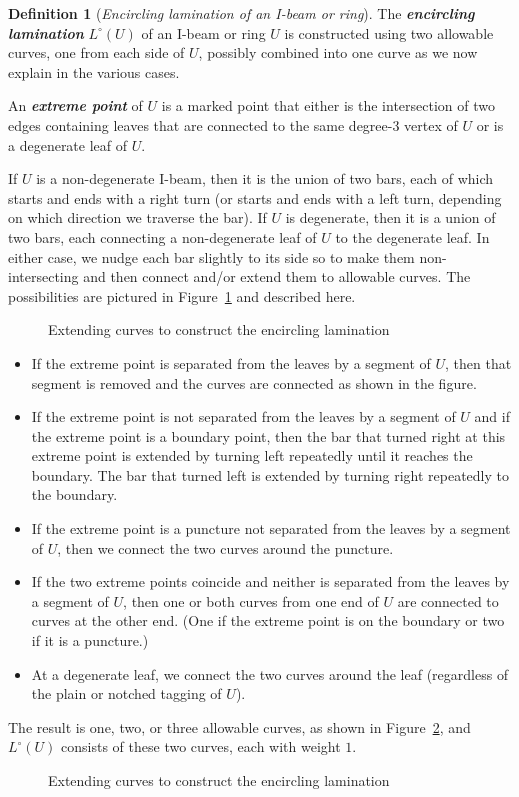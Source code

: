 \documentclass{amsart}
\theoremstyle{definition}
\newtheorem{definition}[proposition]{Definition}
\theoremstyle{remark}
\numberwithin{equation}{section}
\newcommand{\newword}[1]{\textbf{\emph{#1}}}
\newcommand{\0}{{\mathbf{0}}}
\begin{document}
\begin{definition}[\emph{Encircling lamination of an I-beam or ring}]\label{encirc def}
The \newword{encircling lamination} $L^\circ(U)$ of an I-beam or ring $U$ is constructed using two allowable curves, one from each side of $U$, possibly combined into one curve as we now explain in the various cases.

An \newword{extreme point} of $U$ is a marked point that either is the intersection of two edges containing leaves that are connected to the same degree-$3$ vertex of $U$ or is a degenerate leaf of $U$.

If $U$ is a non-degenerate I-beam, then  it is the union of two bars, each of which starts and ends with a right turn (or starts and ends with a left turn, depending on which direction we traverse the bar).
If $U$ is degenerate, then it is a union of two bars, each connecting a non-degenerate leaf of $U$ to the degenerate leaf.
In either case, we nudge each bar slightly to its side so to make them non-intersecting and then connect and/or extend them to allowable curves.
The possibilities are pictured in Figure~\ref{extend fig} and described here.
\begin{figure}
\caption{Extending curves to construct the encircling lamination}
\label{extend fig}
\end{figure}
\begin{itemize}
\item
If the extreme point is separated from the leaves by a segment of $U$, then that segment is removed and the curves are connected as shown in the figure.
\item
If the extreme point is not separated from the leaves by a segment of $U$ and if the extreme point is a boundary point, then the bar that turned right at this extreme point is extended by turning left repeatedly until it reaches the boundary.
The bar that turned left is extended by turning right repeatedly to the boundary.
\item
If the extreme point is a puncture not separated from the leaves by a segment of $U$, then we connect the two curves around the puncture.
\item
If the two extreme points coincide and neither is separated from the leaves by a segment of $U$, then one or both curves from one end of $U$ are connected to curves at the other end.
(One if the extreme point is on the boundary or two if it is a puncture.)
\item
At a degenerate leaf, we connect the two curves around the leaf (regardless of the plain or notched tagging of $U$).  
\end{itemize}
The result is one, two, or three allowable curves, as shown in Figure~\ref{encirc fig}, and $L^\circ(U)$ consists of these two curves, each with weight $1$.
\begin{figure}
\caption{Extending curves to construct the encircling lamination}
\label{encirc fig}
\end{figure}


\end{definition}
\end{document}
